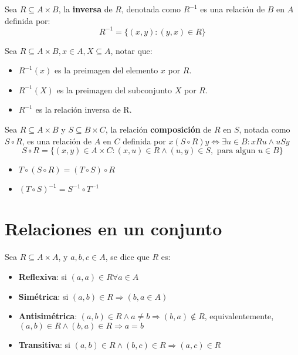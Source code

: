 \documentclass[11pt,a4paper]{article}
\begin{document}
\noindent \dotfill

Sea $R \subseteq A \times B$, la \textbf{inversa} de $R$, denotada como $R^{-1}$ es una relaci\'on de $B$ en $A$ definida por:
$$R^{-1} = \{ (x,y):(y,x) \in R \}$$

\noindent \dotfill

Sea $R \subseteq A \times B, x\in A, X\subseteq A$, notar que:
\begin{itemize}
\item $R^{-1}(x)$ es la preimagen del elemento $x$ por $R$.
\item $R^{-1}(X)$ es la preimagen del subconjunto $X$ por $R$.
\item $R^{-1}$ es la relaci\'on inversa de R.
\end{itemize}
\noindent \dotfill

Sea $R \subseteq A \times B$ y $S \subseteq B \times C$, la relaci\'on \textbf{composici\'on} de $R$ en $S$, notada como $S \circ R$, es una relaci\'on de $A$ en $C$ definida por $x(S \circ R)y \iff \exists u \in B : xRu \land uSy$
$$ S \circ R = \{ (x,y) \in A\times C : (x,u) \in R \land (u,y) \in S, \text{ para algun } u \in B \} $$

\begin{multicols}{2}
\begin{itemize}
\item $T \circ (S \circ R) = (T \circ S) \circ R$
\item $(T \circ S)^{-1} = S^{-1} \circ T^{-1}$
\end{itemize}
\end{multicols}

\noindent \dotfill

\newpage
\section{Relaciones en un conjunto}
Sea $R \subseteq A \times A$, y $a,b,c \in A$, se dice que $R$ es:
\begin{itemize}
\item \textbf{Reflexiva}: si $(a,a) \in R \forall a \in A$
\item \textbf{Sim\'etrica}: si $(a,b) \in R \Rightarrow (b,a \in A)$
\item \textbf{Antisim\'etrica}: $(a,b) \in R \land a \not = b \Rightarrow (b,a) \not \in R$, equivalentemente, $(a,b) \in R \land (b,a) \in R \Rightarrow a = b$
\item \textbf{Transitiva}: si $(a,b) \in R \land (b,c) \in R \Rightarrow (a,c) \in R$
\end{itemize}
\end{document}
